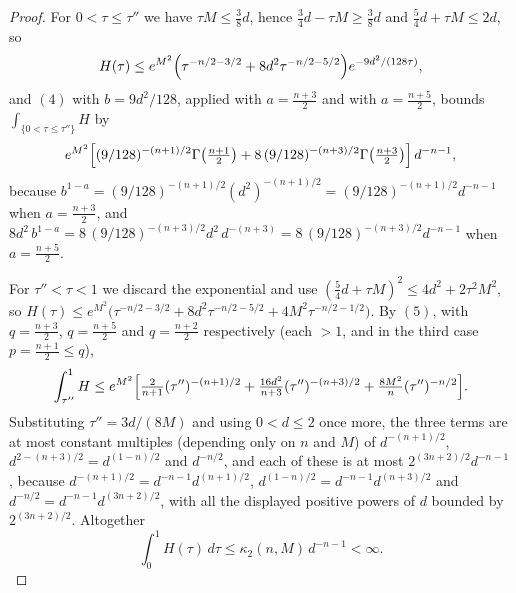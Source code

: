 \begin{proof}
For $0 < \tau \leq \tau''$ we have $\tau M \leq \tfrac38 d$, hence
$\tfrac34 d - \tau M \geq \tfrac38 d$ and $\tfrac54 d + \tau M \leq 2d$, so
\[
  H(\tau) \leq e^{M^2}\Bigl(\tau^{-n/2-3/2} + 8d^2\tau^{-n/2-5/2}\Bigr)
    e^{-9d^2/(128\tau)} ,
\]
and $(4)$ with $b = 9d^2/128$, applied with $a = \tfrac{n+3}{2}$ and with
$a = \tfrac{n+5}{2}$, bounds $\int_{\{0<\tau\leq\tau''\}}H$ by
\[
  e^{M^2}\Bigl[(9/128)^{-(n+1)/2}\Gamma\bigl(\tfrac{n+1}{2}\bigr)
    + 8\,(9/128)^{-(n+3)/2}\Gamma\bigl(\tfrac{n+3}{2}\bigr)\Bigr]\,d^{-n-1} ,
\]
because $b^{1-a} = (9/128)^{-(n+1)/2}(d^2)^{-(n+1)/2}
 = (9/128)^{-(n+1)/2}d^{-n-1}$ when $a = \tfrac{n+3}{2}$, and
$8d^2\,b^{1-a} = 8\,(9/128)^{-(n+3)/2}d^2\,d^{-(n+3)} = 8\,(9/128)^{-(n+3)/2}
 d^{-n-1}$ when $a = \tfrac{n+5}{2}$.

For $\tau'' < \tau < 1$ we discard the exponential and use
$(\tfrac54 d+\tau M)^2 \leq 4d^2 + 2\tau^2M^2$, so
$H(\tau) \leq e^{M^2}\bigl(\tau^{-n/2-3/2} + 8d^2\tau^{-n/2-5/2}
 + 4M^2\tau^{-n/2-1/2}\bigr)$.  By $(5)$, with $q = \tfrac{n+3}{2}$,
$q = \tfrac{n+5}{2}$ and $q = \tfrac{n+2}{2}$ respectively (each $>1$, and in
the third case $p = \tfrac{n+1}{2} \leq q$),
\[
  \int_{\tau''}^1 H
    \leq e^{M^2}\Bigl[\tfrac{2}{n+1}(\tau'')^{-(n+1)/2}
      + \tfrac{16d^2}{n+3}(\tau'')^{-(n+3)/2}
      + \tfrac{8M^2}{n}(\tau'')^{-n/2}\Bigr] .
\]
Substituting $\tau'' = 3d/(8M)$ and using $0 < d \leq 2$ once more, the three
terms are at most constant multiples (depending only on $n$ and $M$) of
$d^{-(n+1)/2}$, $d^{2-(n+3)/2} = d^{(1-n)/2}$ and $d^{-n/2}$, and each of these
is at most $2^{(3n+2)/2}d^{-n-1}$, because
$d^{-(n+1)/2} = d^{-n-1}d^{(n+1)/2}$,
$d^{(1-n)/2} = d^{-n-1}d^{(n+3)/2}$ and
$d^{-n/2} = d^{-n-1}d^{(3n+2)/2}$, with all the displayed positive powers of
$d$ bounded by $2^{(3n+2)/2}$.  Altogether
\begin{equation*}
  \int_0^1 H(\tau)\,d\tau \leq \kappa_2(n,M)\,d^{-n-1} < \infty . \tag{10}
\end{equation*}


\end{proof}
